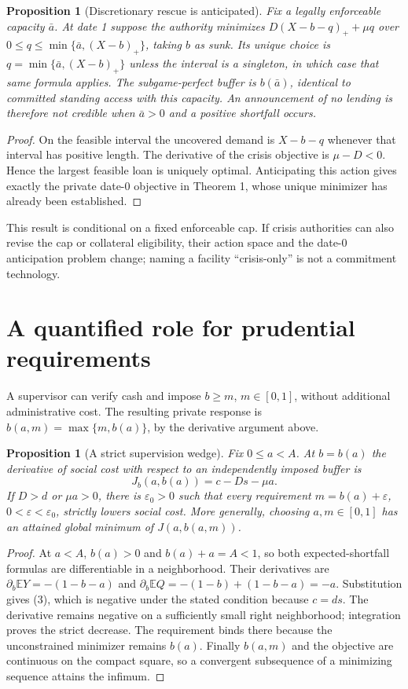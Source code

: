 \documentclass[11pt]{article}
\newtheorem{proposition}[theorem]{Proposition}
\theoremstyle{remark}
\newcommand{\E}{\mathbb E}
\begin{document}
\begin{proposition}[Discretionary rescue is anticipated]
Fix a legally enforceable capacity $\bar a$. At date 1 suppose the authority
minimizes $D(X-b-q)_++\mu q$ over
$0\leq q\leq\min\{\bar a,(X-b)_+\}$, taking $b$ as sunk.
Its unique choice is $q=\min\{\bar a,(X-b)_+\}$ unless the interval is a
singleton, in which case that same formula applies. The subgame-perfect
buffer is $b(\bar a)$, identical to committed standing access with this
capacity. An announcement of no lending is therefore not credible when
$\bar a>0$ and a positive shortfall occurs.
\end{proposition}
\begin{proof}
On the feasible interval the uncovered demand is $X-b-q$ whenever that
interval has positive length. The derivative of the crisis objective is
$\mu-D<0$. Hence the largest feasible loan is uniquely optimal. Anticipating
this action gives exactly the private date-0 objective in Theorem 1, whose
unique minimizer has already been established.
\end{proof}
This result is conditional on a fixed enforceable cap. If crisis authorities
can also revise the cap or collateral eligibility, their action space and
the date-0 anticipation problem change; naming a facility ``crisis-only''
is not a commitment technology.

\section{A quantified role for prudential requirements}
A supervisor can verify cash and impose $b\geq m$, $m\in[0,1]$, without
additional administrative cost. The resulting private response is
$b(a,m)=\max\{m,b(a)\}$, by the derivative argument above.
\begin{proposition}[A strict supervision wedge]
Fix $0\leq a<A$. At $b=b(a)$ the derivative of social cost with respect
to an independently imposed buffer is
\[
 J_b(a,b(a))=c-Ds-\mu a.
 \tag{3}
\]
If $D>d$ or $\mu a>0$, there is $\varepsilon_0>0$ such that every
requirement $m=b(a)+\varepsilon$, $0<\varepsilon<\varepsilon_0$,
strictly lowers social cost. More generally, choosing $a,m\in[0,1]$ has
an attained global minimum of $J(a,b(a,m))$.
\end{proposition}
\begin{proof}
At $a<A$, $b(a)>0$ and $b(a)+a=A<1$, so both expected-shortfall formulas
are differentiable in a neighborhood. Their derivatives are
$\partial_b\E Y=-(1-b-a)$ and
$\partial_b\E Q=-(1-b)+(1-b-a)=-a$.
Substitution gives (3), which is negative under the stated condition
because $c=ds$. The derivative remains negative on a sufficiently small
right neighborhood; integration proves the strict decrease. The requirement
binds there because the unconstrained minimizer remains $b(a)$.
Finally $b(a,m)$ and the objective are continuous on the compact square,
so a convergent subsequence of a minimizing sequence attains the infimum.
\end{proof}
\end{document}
